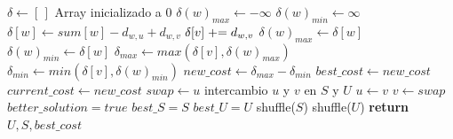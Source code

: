 \begin{algorithm}[H]
\begin{algorithmic}
                \State
                \State $\delta \gets [\,]$ \Comment Array inicializado a 0
                \State $\delta(w)_{max} \gets -\infty$
                \State $\delta(w)_{min} \gets \infty$
                \State
                        \State $\delta[w] \gets sum[w] - d_{w,u} + d_{w,v}$
                        \State $\delta[v] \mathrel{+}= d_{w,v}$
                        \State
                            \State $\delta(w)_{max} \gets \delta[w]$
                        \EndIf
                            \State $\delta(w)_{min} \gets \delta[w]$
                        \EndIf
                    \EndIf
                \EndFor
                \State
                \State $\delta_{max} \gets max(\delta[v], \delta(w)_{max})$
                \State $\delta_{min} \gets min(\delta[v], \delta(w)_{min})$
                \State $new\_cost \gets \delta_{max} - \delta_{min}$
                    \State $best\_cost \gets new\_cost$
                    \State $current\_cost \gets new\_cost$
                    \State
                    \State $swap \gets u$ \Comment intercambio $u$ y $v$ en $S$ y $U$
                    \State $u \gets v$
                    \State $v \gets swap$
                    \State $better\_solution = true$
                    \State $best\_S = S$
                    \State $best\_U = U$
                \EndIf
                \State
            \EndFor
        \EndFor
        \State
        \State shuffle($S$)
        \State shuffle($U$)
    \EndWhile
    \State
    \State \textbf{return} $U, S, best\_cost$  
\EndProcedure
\end{algorithmic}
\end{algorithm}

